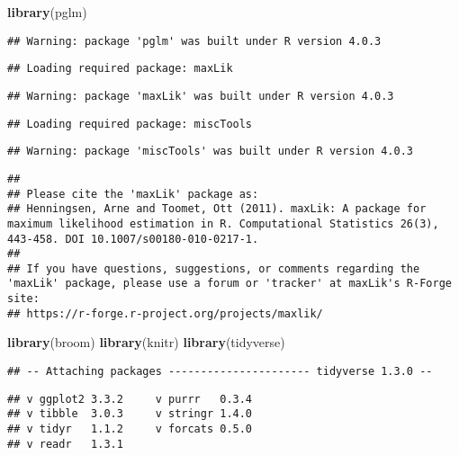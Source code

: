 \documentclass[
]{article}
\newenvironment{Shaded}{\begin{snugshade}}{\end{snugshade}}
\newcommand{\KeywordTok}[1]{\textcolor[rgb]{0.13,0.29,0.53}{\textbf{#1}}}
\newcommand{\NormalTok}[1]{#1}
\begin{document}
\begin{Shaded}
\begin{Highlighting}[]
\KeywordTok{library}\NormalTok{(pglm)}
\end{Highlighting}
\end{Shaded}

\begin{verbatim}
## Warning: package 'pglm' was built under R version 4.0.3
\end{verbatim}

\begin{verbatim}
## Loading required package: maxLik
\end{verbatim}

\begin{verbatim}
## Warning: package 'maxLik' was built under R version 4.0.3
\end{verbatim}

\begin{verbatim}
## Loading required package: miscTools
\end{verbatim}

\begin{verbatim}
## Warning: package 'miscTools' was built under R version 4.0.3
\end{verbatim}

\begin{verbatim}
## 
## Please cite the 'maxLik' package as:
## Henningsen, Arne and Toomet, Ott (2011). maxLik: A package for maximum likelihood estimation in R. Computational Statistics 26(3), 443-458. DOI 10.1007/s00180-010-0217-1.
## 
## If you have questions, suggestions, or comments regarding the 'maxLik' package, please use a forum or 'tracker' at maxLik's R-Forge site:
## https://r-forge.r-project.org/projects/maxlik/
\end{verbatim}

\begin{Shaded}
\begin{Highlighting}[]
\KeywordTok{library}\NormalTok{(broom)}
\KeywordTok{library}\NormalTok{(knitr) }
\KeywordTok{library}\NormalTok{(tidyverse)}
\end{Highlighting}
\end{Shaded}

\begin{verbatim}
## -- Attaching packages ---------------------- tidyverse 1.3.0 --
\end{verbatim}

\begin{verbatim}
## v ggplot2 3.3.2     v purrr   0.3.4
## v tibble  3.0.3     v stringr 1.4.0
## v tidyr   1.1.2     v forcats 0.5.0
## v readr   1.3.1
\end{verbatim}
\end{document}
